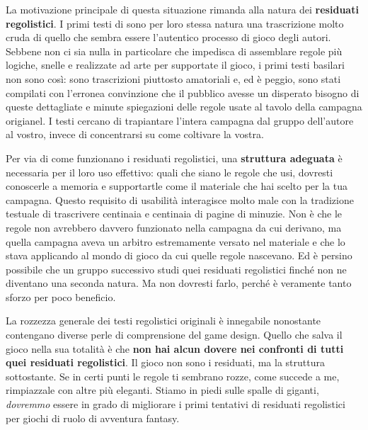 La motivazione principale di questa situazione rimanda alla natura dei \textbf{residuati regolistici}. I primi testi di \dnd{} sono per loro stessa natura una trascrizione molto cruda di quello che sembra essere l'autentico processo di gioco degli autori. Sebbene non ci sia nulla in particolare che impedisca di assemblare regole più logiche, snelle e realizzate ad arte per supportate il gioco, i primi testi basilari non sono così: sono trascrizioni piuttosto amatoriali e, ed è peggio, sono stati compilati con l'erronea convinzione che il pubblico avesse un disperato bisogno di queste dettagliate e minute spiegazioni delle regole usate al tavolo della campagna origianel. I testi cercano di trapiantare l'intera campagna dal gruppo dell'autore al vostro, invece di concentrarsi su come coltivare la vostra.

Per via di come funzionano i residuati regolistici, una \textbf{struttura adeguata} è necessaria per il loro uso effettivo: quali che siano le regole che usi, dovresti conoscerle a memoria e supportartle come il materiale che hai scelto per la tua campagna. Questo requisito di usabilità interagisce molto male con la tradizione testuale di trascrivere centinaia e centinaia di pagine di minuzie. Non è che le regole non avrebbero davvero funzionato nella campagna da cui derivano, ma quella campagna aveva un arbitro estremamente versato nel materiale e che lo stava applicando al mondo di gioco da cui quelle regole nascevano. Ed è persino possibile che un gruppo successivo studi quei residuati regolistici finché non ne diventano una seconda natura. Ma non dovresti farlo, perché è veramente tanto sforzo per poco beneficio.

La rozzezza generale dei testi regolistici originali è innegabile nonostante contengano diverse perle di comprensione del game design. Quello che salva il gioco nella sua totalità è che \textbf{non hai alcun dovere nei confronti di tutti quei residuati regolistici}. Il gioco non sono i residuati, ma la struttura sottostante. Se in certi punti le regole ti sembrano rozze, come succede a me, rimpiazzale con altre più eleganti. Stiamo in piedi sulle spalle di giganti, \textit{dovremmo} essere in grado di migliorare i primi tentativi di residuati regolistici per giochi di ruolo di avventura fantasy.

